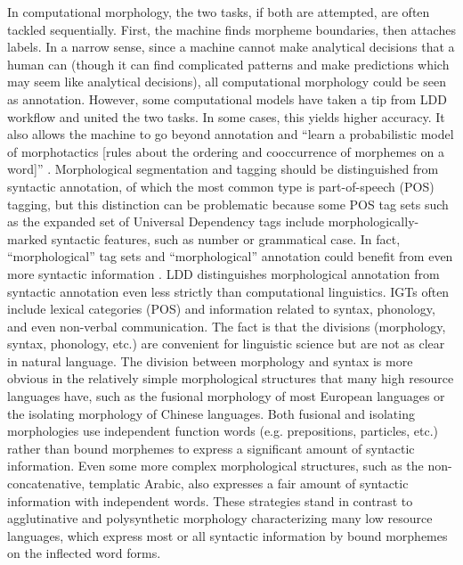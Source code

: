 \documentclass[12pt]{article}
\begin{document}
In computational morphology, the two tasks, if both are attempted, are often tackled sequentially. First, the machine finds morpheme boundaries, then attaches labels. In a narrow sense, since a machine cannot make analytical decisions that a human can (though it can find complicated patterns and make predictions which may seem like analytical decisions), all computational morphology could be seen as annotation. However, some computational models have taken a tip from LDD workflow and united the two tasks. In some cases, this yields higher accuracy. It also allows the machine to go beyond annotation and ``learn a probabilistic model of morphotactics [rules about the ordering and cooccurrence of morphemes on a word]'' \cite[page 165]{cotterell_labeled_2015}.
Morphological segmentation and tagging should be distinguished from syntactic annotation, of which the most common type is part-of-speech (POS) tagging, but this distinction can be problematic because some POS tag sets such as the expanded set of Universal Dependency tags \cite{de_marneffe_universal_2014} include morphologically-marked syntactic features, such as number or grammatical case. In fact, ``morphological'' tag sets and ``morphological'' annotation could benefit from even more syntactic information \cite{cotterell_cross-lingual_2017}. LDD distinguishes morphological annotation from syntactic annotation even less strictly than computational linguistics. IGTs often include lexical categories (POS) and information related to syntax, phonology, and even non-verbal communication. The fact is that the divisions (morphology, syntax, phonology, etc.) are convenient for linguistic science but are not as clear in natural language. The division between morphology and syntax is more obvious in the relatively simple morphological structures that many high resource languages have, such as the fusional morphology of most European languages or the isolating morphology of Chinese languages. Both fusional and isolating morphologies use independent function words (e.g. prepositions, particles, etc.) rather than bound morphemes to express a significant amount of syntactic information. Even some more complex morphological structures, such as the non-concatenative, templatic Arabic, also expresses a fair amount of syntactic information with independent words. These strategies stand in contrast to agglutinative and polysynthetic morphology characterizing many low resource languages, which express most or all syntactic information by bound morphemes on the inflected word forms. 
\end{document}
